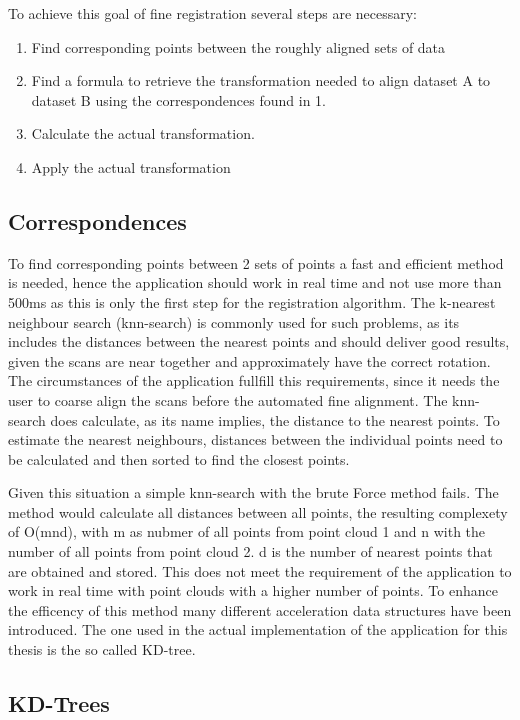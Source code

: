 \documentclass[hyperref,english,bachelorofscience,bibnum]{cgvpub}
\begin{document}
To achieve this goal of fine registration several steps are necessary:
\begin{enumerate}
\item  Find corresponding points between the roughly aligned sets of data
\item  Find a formula to retrieve the transformation needed to align dataset A to dataset B using the correspondences found in 1.
\item Calculate the actual transformation.
\item Apply the actual transformation
\end{enumerate}

\subsection{Correspondences}

To find corresponding points between 2 sets of points a fast and efficient method is needed, hence the application should work in real time and not use more than 500ms as this is only the first step for the registration algorithm.
The k-nearest neighbour search (knn-search) is commonly used for such problems, as its includes the distances between the nearest points and should deliver good results, given the scans are near together and approximately have the correct rotation. The circumstances of the application fullfill this requirements, since it needs the user to coarse align the scans before the automated fine alignment.
The knn-search does calculate, as its name implies, the distance to the nearest points. To estimate the nearest neighbours, distances between the individual points need to be calculated and then sorted to find the closest points.

Given this situation a simple knn-search with the brute Force method fails. The method would calculate all distances between all points, the resulting complexety of  O(mnd)\cite{Garcia2008}, with m as nubmer of all points from point cloud 1 and n with the number of all points from point cloud 2. d is the number of nearest points that are obtained and stored. This does not meet the requirement of the application to work in real time with point clouds with a higher number of points.
To enhance the efficency of this method many different acceleration data structures have been introduced. The one used in the actual implementation of the application for this thesis is the so called KD-tree.

\subsection{KD-Trees}
\end{document}
